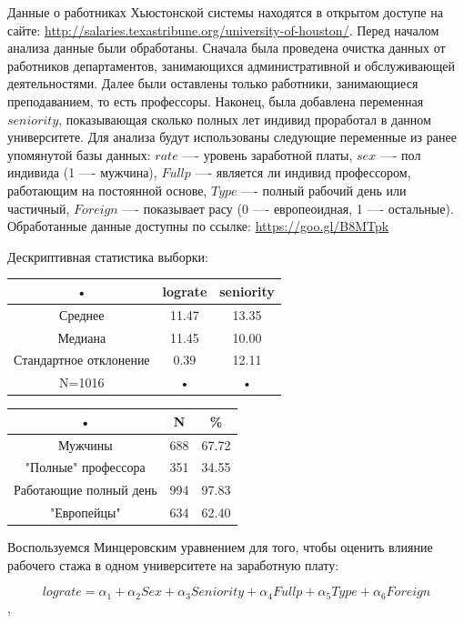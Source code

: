 \documentclass[a4paper, 12pt]{article}
\theoremstyle{definition}
\theoremstyle{plain}
\begin{document}
Данные о работниках Хьюстонской системы находятся в открытом доступе на сайте: \url{http://salaries.texastribune.org/university-of-houston/}. Перед началом анализа данные были обработаны. Сначала была проведена очистка данных от работников департаментов, занимающихся административной и обслуживающей деятельностями. Далее были оставлены только работники, занимающиеся преподаванием, то есть профессоры. Наконец, была добавлена переменная $seniority$, показывающая сколько полных лет индивид проработал в данном университете.
Для анализа будут использованы следующие переменные из ранее упомянутой базы данных: $rate$ —- уровень заработной платы, $sex$ —- пол индивида (1 —- мужчина), $Fullp$ —- является ли индивид профессором, работающим на постоянной основе, $Type$ —- полный рабочий день или частичный, $Foreign$ —- показывает расу (0 —- европеоидная, 1 —- остальные). Обработанные данные доступны по ссылке: \url{https://goo.gl/B8MTpk}

Дескриптивная статистика выборки:

\begin{center}
\begin{tabular}{|c|c|c|}
\hline
• & lograte & seniority \\
\hline
Среднее & 11.47 & 13.35 \\
\hline
Медиана & 11.45 & 10.00 \\
\hline
Стандартное отклонение & 0.39 & 12.11 \\
\hline
N=1016 & • & • \\
\hline
\end{tabular}
\end{center}

\begin{center}
\begin{tabular}{|c|c|c|}
\hline
• & N & \% \\
\hline
Мужчины & 688 & 67.72 \\
\hline
"Полные" профессора & 351 & 34.55 \\
\hline
Работающие полный день & 994 & 97.83 \\
\hline
"Европейцы" & 634 & 62.40 \\
\hline
\end{tabular}
\end{center}

Воспользуемся Минцеровским уравнением для того, чтобы оценить влияние рабочего стажа в одном университете на заработную плату:

$$lograte=\alpha_1+\alpha_2 Sex+\alpha_3 Seniority +\alpha_4 Fullp+\alpha_5 Type +\alpha_6 Foreign$$,
\end{document}
